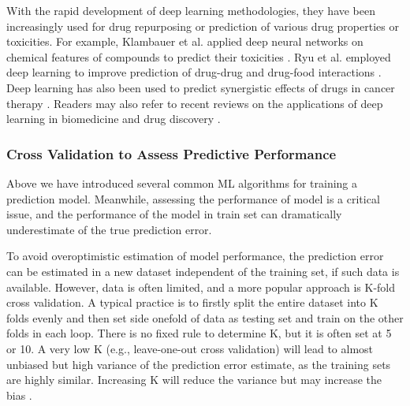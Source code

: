       With the rapid development of deep learning methodologies, they have been increasingly used for drug repurposing \cite{aliper2016deep,zhao2018drug,xie2017discovery} or prediction of various drug properties or toxicities. For example, Klambauer et al. applied deep neural networks on chemical features of compounds to predict their toxicities \cite{mayr2016deeptox}. Ryu et al. employed deep learning to improve prediction of drug-drug and drug-food interactions \cite{ryu2018deep}. Deep learning has also been used to predict synergistic effects of drugs in cancer therapy \cite{preuer2018deepsynergy}. Readers may also refer to recent reviews on the applications of deep learning in biomedicine and drug discovery \cite{baskin2016renaissance, chen2018rise, ching2018opportunities}.

    \subsubsection{Cross Validation to Assess Predictive Performance}
      Above we have introduced several common ML algorithms for training a prediction model. Meanwhile, assessing the performance of model is a critical issue, and the performance of the model in train set can dramatically underestimate of the true prediction error.
    
      To avoid overoptimistic estimation of model performance, the prediction error can be estimated in a new dataset independent of the training set, if such data is available. However, data is often limited, and a more popular approach is K-fold cross validation. A typical practice is to firstly split the entire dataset into K folds evenly and then set side onefold of data as testing set and train on the other folds in each loop. There is no fixed rule to determine K, but it is often set at 5 or 10. A very low K (e.g., leave-one-out cross validation) will lead to almost unbiased but high variance of the prediction error estimate, as the training sets are highly similar. Increasing K will reduce the variance but may increase the bias \cite{friedman2001elements}.
      
